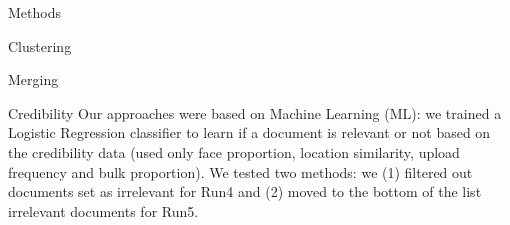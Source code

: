 \documentclass{acm_proc_article-me}
\begin{document}
\begin{section}{Methods}
\begin{subsection}{Clustering}
\begin{subsubsection}{Merging}



\end{subsubsection}

\end{subsection}

\begin{subsection}{Credibility}
Our approaches were based on Machine Learning (ML): we trained a Logistic Regression classifier to learn if a document is relevant or not based on the credibility data (used only face proportion, location similarity, upload frequency and bulk proportion).
We tested two methods: we (1) filtered out documents set as irrelevant for Run4 and (2) moved to the bottom of the list irrelevant documents for Run5.

\end{subsection}
\end{section}
\end{document}
